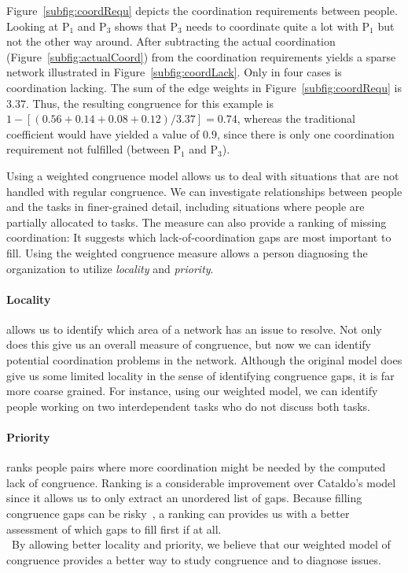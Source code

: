 \documentclass[times, 10pt,twocolumn]{article}
\begin{document}
Figure~\ref{subfig:coordRequ} depicts the coordination requirements between people.
Looking at P$_1$ and P$_3$ shows that P$_3$ needs to coordinate quite a lot with P$_1$ but not the other way around.  
After subtracting the actual coordination (Figure~\ref{subfig:actualCoord}) from the coordination requirements yields a sparse network illustrated in Figure~\ref{subfig:coordLack}.
Only in four cases is coordination lacking.
The sum of the edge weights in Figure~\ref{subfig:coordRequ} is $3.37$.
Thus, the resulting congruence for this example is $1-[(0.56+0.14+0.08+0.12)/3.37] = 0.74$, whereas the traditional coefficient would have yielded a value of $0.9$, since there is only one coordination requirement not fulfilled (between P$_1$ and P$_3$).


\label{sec:benefit}

Using a weighted congruence model allows us to deal with situations that are not handled with regular congruence.
We can investigate relationships between people and the tasks in finer-grained detail, including situations where people are partially allocated to tasks. 
The measure can also provide a ranking of missing coordination: It suggests which lack-of-coordination gaps are most important to fill. Using the weighted congruence measure allows a person diagnosing the organization to utilize \emph{locality} and \emph{priority}.

\paragraph{Locality}
allows us to identify which area of a network has an issue to resolve.
Not only does this give us an overall measure of congruence, but now we can identify potential coordination problems in the network.
Although the original model does give us some limited locality in the sense of identifying congruence gaps, it is far more coarse grained.
For instance, using our weighted model, we can identify people working on two interdependent tasks who do not discuss both tasks.

\paragraph{Priority} 
ranks people pairs where more coordination might be needed by the computed lack of congruence.
Ranking is a considerable improvement over Cataldo's model since it allows us to only extract an unordered list of gaps. 
Because filling congruence gaps can be risky~\cite{valetto2007:value,ehrlich2008:congruence_gaps}, a ranking can provides us with a better assessment of which gaps to fill first if at all.
\\ \ 
\indent By allowing better locality and priority, we believe that our weighted model of congruence provides a better way to study congruence and to diagnose issues.
\end{document}
